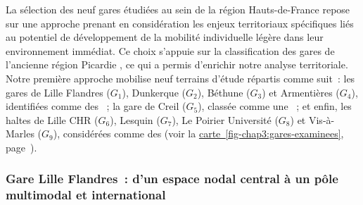 \begin{refsegment}
La sélection des neuf gares étudiées au sein de la région Hauts-de-France repose sur une approche prenant en considération les enjeux territoriaux spécifiques liés au potentiel de développement de la mobilité individuelle légère dans leur environnement immédiat. Ce choix s’appuie sur la classification des gares de l’ancienne région Picardie \textcolor{blue}{\autocite[2-4]{cete_nord_picardie_profils_2011}}, ce qui a permis d’enrichir notre analyse territoriale. Notre première approche mobilise neuf terrains d’étude répartis comme suit~: les gares de Lille Flandres (\(G_1\)), Dunkerque (\(G_2\)), Béthune (\(G_3\)) et Armentières (\(G_4\)), identifiées comme des ~; la gare de Creil (\(G_5\)), classée comme une ~; et enfin, les haltes de Lille CHR (\(G_6\)), Lesquin (\(G_7\)), Le Poirier Université (\(G_8\)) et Vis-à-Marles (\(G_9\)), considérées comme des  (voir la \hyperref[fig-chap3:gares-examinees]{carte~\ref{fig-chap3:gares-examinees}}, page~\pageref{fig-chap3:gares-examinees}).%

\subsubsection*{Gare Lille Flandres~: d'un espace nodal central à un pôle multimodal et international
    \label{chap3:application-observation-quantitative-lille-flandres}
    }


\end{refsegment}
